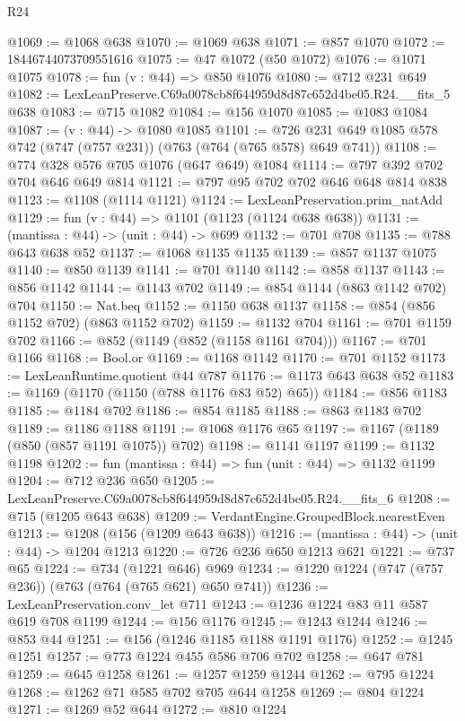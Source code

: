 \begin{lexlean}{R24}
\begin{coremodule}
@1069 := @1068 @638
@1070 := @1069 @638
@1071 := @857 @1070
@1072 := 18446744073709551616
@1075 := @47 @1072 (@50 @1072)
@1076 := @1071 @1075
@1078 := fun (v : @44) => @850 @1076
@1080 := @712 @231 @649
@1082 := LexLeanPreserve.C69a0078cb8f644959d8d87c652d4be05.R24.__fits_5 @638
@1083 := @715 @1082
@1084 := @156 @1070
@1085 := @1083 @1084
@1087 := (v : @44) -> @1080 @1085
@1101 := @726 @231 @649 @1085 @578 @742 (@747 (@757 @231)) (@763 (@764 (@765 @578) @649 @741))
@1108 := @774 @328 @576 @705 @1076 (@647 @649) @1084
@1114 := @797 @392 @702 @704 @646 @649 @814
@1121 := @797 @95 @702 @702 @646 @648 @814 @838
@1123 := @1108 (@1114 @1121)
@1124 := LexLeanPreservation.prim_natAdd
@1129 := fun (v : @44) => @1101 (@1123 (@1124 @638 @638))
@1131 := (mantissa : @44) -> (unit : @44) -> @699
@1132 := @701 @708
@1135 := @788 @643 @638 @52
@1137 := @1068 @1135 @1135
@1139 := @857 @1137 @1075
@1140 := @850 @1139
@1141 := @701 @1140
@1142 := @858 @1137
@1143 := @856 @1142
@1144 := @1143 @702
@1149 := @854 @1144 (@863 @1142 @702) @704
@1150 := Nat.beq
@1152 := @1150 @638 @1137
@1158 := @854 (@856 @1152 @702) (@863 @1152 @702)
@1159 := @1132 @704
@1161 := @701 @1159 @702
@1166 := @852 (@1149 (@852 (@1158 @1161 @704)))
@1167 := @701 @1166
@1168 := Bool.or
@1169 := @1168 @1142
@1170 := @701 @1152
@1173 := LexLeanRuntime.quotient @44 @787
@1176 := @1173 @643 @638 @52
@1183 := @1169 (@1170 (@1150 (@788 @1176 @83 @52) @65))
@1184 := @856 @1183
@1185 := @1184 @702
@1186 := @854 @1185
@1188 := @863 @1183 @702
@1189 := @1186 @1188
@1191 := @1068 @1176 @65
@1197 := @1167 (@1189 (@850 (@857 @1191 @1075)) @702)
@1198 := @1141 @1197
@1199 := @1132 @1198
@1202 := fun (mantissa : @44) => fun (unit : @44) => @1132 @1199
@1204 := @712 @236 @650
@1205 := LexLeanPreserve.C69a0078cb8f644959d8d87c652d4be05.R24.__fits_6
@1208 := @715 (@1205 @643 @638)
@1209 := VerdantEngine.GroupedBlock.nearestEven
@1213 := @1208 (@156 (@1209 @643 @638))
@1216 := (mantissa : @44) -> (unit : @44) -> @1204 @1213
@1220 := @726 @236 @650 @1213 @621
@1221 := @737 @65
@1224 := @734 (@1221 @646) @969
@1234 := @1220 @1224 (@747 (@757 @236)) (@763 (@764 (@765 @621) @650 @741))
@1236 := LexLeanPreservation.conv_let @711
@1243 := @1236 @1224 @83 @11 @587 @619 @708 @1199
@1244 := @156 @1176
@1245 := @1243 @1244
@1246 := @853 @44
@1251 := @156 (@1246 @1185 @1188 @1191 @1176)
@1252 := @1245 @1251
@1257 := @773 @1224 @455 @586 @706 @702
@1258 := @647 @781
@1259 := @645 @1258
@1261 := @1257 @1259 @1244
@1262 := @795 @1224
@1268 := @1262 @71 @585 @702 @705 @644 @1258
@1269 := @804 @1224
@1271 := @1269 @52 @644
@1272 := @810 @1224

\end{coremodule}
\end{lexlean}
